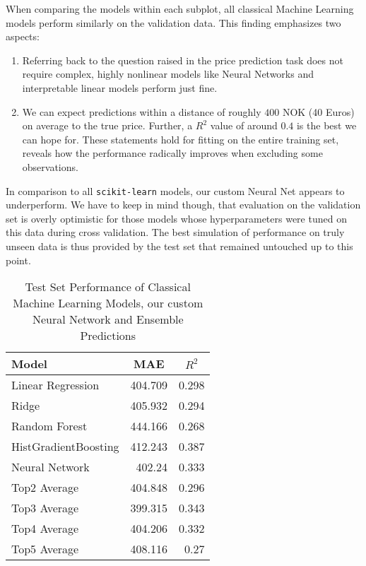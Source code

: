 When comparing the models within each subplot, all classical Machine Learning models perform similarly on the validation data.
This finding emphasizes two aspects:
\begin{enumerate}
  \item Referring back to the question raised in  the price prediction task does not require complex, highly nonlinear models like Neural Networks and interpretable linear models perform just fine.
  \item We can expect predictions within a distance of roughly $400$ NOK (40 Euros) on average to the true price.
        Further, a $R^2$ value of around $0.4$ is the best we can hope for.
        These statements hold for fitting on the entire training set,  reveals how the performance radically improves when excluding some observations.
\end{enumerate}
In comparison to all \texttt{scikit-learn} models, our custom Neural Net appears to underperform.
We have to keep in mind though, that evaluation on the validation set is overly optimistic for those models whose hyperparameters were tuned on this data during cross validation.
The best simulation of performance on truly unseen data is thus provided by the test set that remained untouched up to this point.

\begin{table}[th]
  \centering
  \begin{tabular}{lrr}
    \hline
    Model                & \multicolumn{1}{c}{MAE} & \multicolumn{1}{c}{$R^2$} \\ \hline
    Linear Regression    & 404.709                 & 0.298                     \\
    Ridge                & 405.932                 & 0.294                     \\
    Random Forest        & 444.166                 & 0.268                     \\
    HistGradientBoosting & 412.243                 & 0.387                     \\
    Neural Network       & 402.24                  & 0.333                     \\
    Top2 Average         & 404.848                 & 0.296                     \\
    Top3 Average         & 399.315                 & 0.343                     \\
    Top4 Average         & 404.206                 & 0.332                     \\
    Top5 Average         & 408.116                 & 0.27                      \\ \hline
  \end{tabular}
  \caption{Test Set Performance of Classical Machine Learning Models, our custom Neural Network and Ensemble Predictions}
  \label{tab:test-set}
\end{table}


